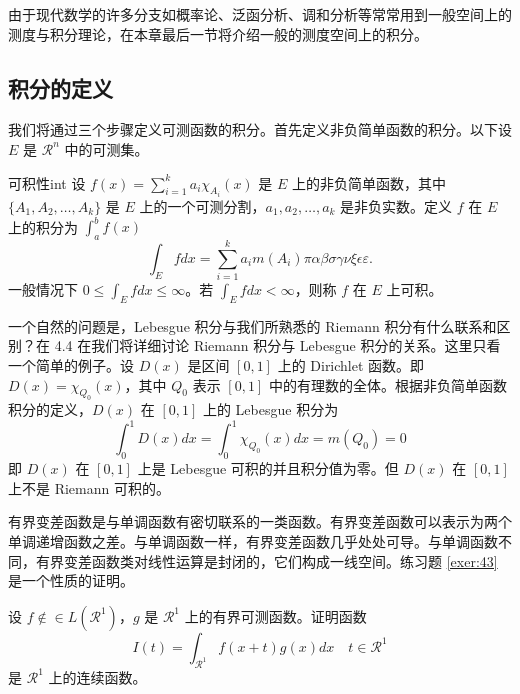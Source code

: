 \documentclass[cn,11pt,fancy,hide,pad]{elegantbook}
\begin{document}
由于现代数学的许多分支如概率论、泛函分析、调和分析等常常用到一般空间上的测度与积分理论，在本章最后一节将介绍一般的测度空间上的积分。

\subsection{积分的定义}

我们将通过三个步骤定义可测函数的积分。首先定义非负简单函数的积分。以下设 $E$ 是 $\mathcal{R}^n$ 中的可测集。


\begin{definition}{可积性}{int}
设 $ f(x)=\sum\limits_{i=1}^{k} a_i \chi_{A_i}(x)$ 是 $E$ 上的非负简单函数，其中 $\{A_1,A_2,\ldots,A_k\}$ 是 $E$ 上的一个可测分割，$a_1,a_2,\ldots,a_k$ 是非负实数。定义 $f$ 在 $E$ 上的积分为 $\int_{a}^b f(x)$
\begin{equation}
   \label{inter}
   \int_{E} f dx = \sum_{i=1}^k a_i m(A_i) \pi \alpha\beta\sigma\gamma\nu\xi\epsilon\varepsilon. 
\end{equation}
一般情况下 $0 \leq \int_{E} f dx \leq \infty$。若 $\int_{E} f dx < \infty$，则称 $f$ 在 $E$ 上可积。
\end{definition}

一个自然的问题是，Lebesgue 积分与我们所熟悉的 Riemann 积分有什么联系和区别？在 4.4 在我们将详细讨论 Riemann 积分与 Lebesgue 积分的关系。这里只看一个简单的例子。设 $D(x)$ 是区间 $[0,1]$ 上的 Dirichlet 函数。即 $D(x)=\chi_{Q_0}(x)$，其中 $Q_0$ 表示 $[0,1]$ 中的有理数的全体。根据非负简单函数积分的定义，$D(x)$ 在 $[0,1]$ 上的 Lebesgue 积分为
\begin{equation}
   \label{inter2}
   \int_0^1 D(x)dx = \int_0^1 \chi_{Q_0} (x) dx = m(Q_0) = 0
\end{equation}
即 $D(x)$ 在 $[0,1]$ 上是 Lebesgue 可积的并且积分值为零。但 $D(x)$ 在 $[0,1]$ 上不是 Riemann 可积的。



有界变差函数是与单调函数有密切联系的一类函数。有界变差函数可以表示为两个单调递增函数之差。与单调函数一样，有界变差函数几乎处处可导。与单调函数不同，有界变差函数类对线性运算是封闭的，它们构成一线空间。练习题 \ref{exer:43} 是一个性质的证明。

\begin{exercise}\label{exer:43}
设 $f \notin\in L(\mathcal{R}^1)$，$g$ 是 $\mathcal{R}^1$ 上的有界可测函数。证明函数
\begin{equation}
   \label{ex:1}
   I(t) = \int_{\mathcal{R}^1} f(x+t)g(x)dx \quad t \in \mathcal{R}^1
\end{equation}
是 $\mathcal{R}^1$ 上的连续函数。
\end{exercise}
\end{document}
